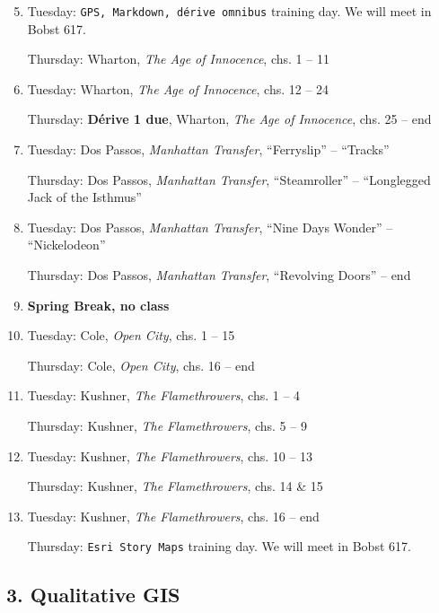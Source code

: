 \begin{enumerate}
  \setcounter{enumi}{4}
\item Tuesday: \texttt{GPS, Markdown, dérive omnibus} training day. We will meet in Bobst 617.

  Thursday: Wharton, \textit{The Age of Innocence}, chs. 1 -- 11

  \item Tuesday: Wharton, \textit{The Age of Innocence},  chs. 12 -- 24

    Thursday: \textbf{\small Dérive 1 due}, Wharton,  \textit{The Age of Innocence}, chs. 25 -- end
  
  \item Tuesday: Dos Passos, \textit{Manhattan Transfer}, “Ferryslip” -- “Tracks”

    Thursday: Dos Passos,  \textit{Manhattan Transfer}, “Steamroller” -- “Longlegged Jack of the Isthmus”

  \item Tuesday: Dos Passos,  \textit{Manhattan Transfer}, “Nine Days Wonder” -- “Nickelodeon”

    Thursday: Dos Passos,  \textit{Manhattan Transfer}, “Revolving Doors” -- end

  \item \textbf{Spring Break, no class}

  \item Tuesday: Cole, \textit{Open City}, chs. 1 -- 15

    Thursday: Cole,  \textit{Open City}, chs. 16 -- end

  \item Tuesday: Kushner, \textit{The Flamethrowers}, chs. 1 -- 4

    Thursday: Kushner, \textit{The Flamethrowers}, chs. 5 -- 9

  \item Tuesday: Kushner, \textit{The Flamethrowers}, chs. 10 -- 13 
  
    Thursday: Kushner, \textit{The Flamethrowers}, chs. 14 \& 15

  \item Tuesday: Kushner, \textit{The Flamethrowers}, chs. 16 -- end 

    Thursday: \texttt{Esri Story Maps} training day. We will meet in Bobst 617.

\end{enumerate}

\subsection{3. Qualitative GIS}

